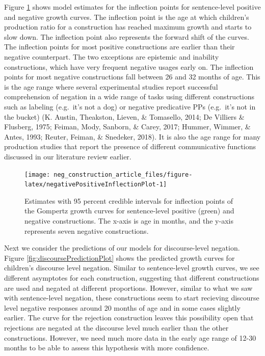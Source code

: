 \documentclass[
  man,floatsintext]{apa6}
\begin{document}
Figure \ref{fig:negativePositiveInflectionPlot} shows model estimates for the inflection points for sentence-level positive and negative growth curves. The inflection point is the age at which children's production ratio for a construction has reached maximum growth and starts to slow down. The inflection point also represents the forward shift of the curves. The inflection points for most positive constructions are earlier than their negative counterpart. The two exceptions are epistemic and inability constructions, which have very frequent negative usages early on. The inflection points for most negative constructions fall between 26 and 32 months of age. This is the age range where several experimental studies report successful comprehension of negation in a wide range of tasks using different constructions such as labeling (e.g.~it's not a dog) or negative predicative PPs (e.g.~it's not in the bucket) (K. Austin, Theakston, Lieven, \& Tomasello, 2014; De Villiers \& Flusberg, 1975; Feiman, Mody, Sanborn, \& Carey, 2017; Hummer, Wimmer, \& Antes, 1993; Reuter, Feiman, \& Snedeker, 2018). It is also the age range for many production studies that report the presence of different communicative functions discussed in our literature review earlier.

\begin{figure}[H]

{\centering \texttt{[image: neg\_construction\_article\_files/figure-latex/negativePositiveInflectionPlot-1]} 

}

\caption{Estimates with 95 percent credible intervals for inflection points of the Gompertz growth curves for sentence-level positive (green) and negative constructions. The x-axis is age in months, and the y-axis represents seven negative constructions.}\label{fig:negativePositiveInflectionPlot}
\end{figure}

Next we consider the predictions of our models for discourse-level negation. Figure \ref{fig:discoursePredictionPlot} shows the predicted growth curves for children's discourse level negation. Similar to sentence-level growth curves, we see different asymptotes for each construction, suggesting that different constructions are used and negated at different proportions. However, similar to what we saw with sentence-level negation, these constructions seem to start recieving discourse level negative responses around 20 months of age and in some cases slightly earlier. The curve for the rejection construction leaves this possibility open that rejections are negated at the discourse level much earlier than the other constructions. However, we need much more data in the early age range of 12-30 months to be able to assess this hypothesis with more confidence.
\end{document}
